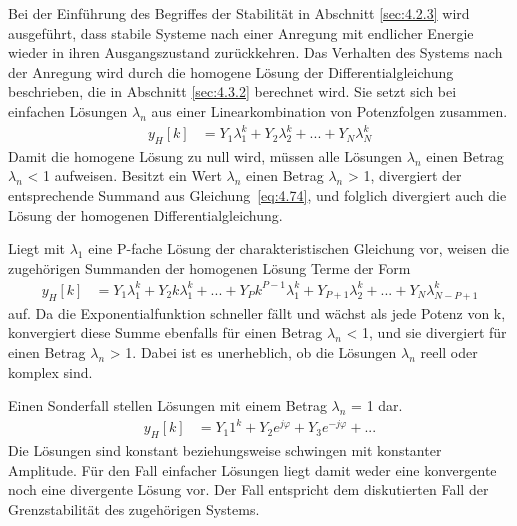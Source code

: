 Bei der Einführung des Begriffes der Stabilität in Abschnitt \ref{sec:4.2.3} wird ausgeführt, dass stabile Systeme nach einer Anregung mit endlicher Energie wieder in ihren Ausgangszustand zurückkehren. Das Verhalten des Systems nach der Anregung wird durch die homogene Lösung der Differentialgleichung beschrieben, die in Abschnitt \ref{sec:4.3.2} berechnet wird. Sie setzt sich bei einfachen Lösungen \(λ_{n}\) aus einer Linearkombination von Potenzfolgen zusammen.
\begin{align}
y_{H}[ k] &= Y_{1}  \lambda_{1}^{k} + Y_{2}  \lambda_{2}^{k} + ... + Y_{N}  \lambda_{N}^{k} \label{eq:4.74}
\end{align}
Damit die homogene Lösung zu null wird, müssen alle Lösungen \(λ_{n}\) einen Betrag \textbar \(λ_{n}\)\textbar{} \textless{} 1 aufweisen. Besitzt ein Wert \(λ_{n}\) einen Betrag \textbar \(λ_{n}\)\textbar{} \textgreater{} 1, divergiert der entsprechende Summand aus Gleichung~\eqref{eq:4.74}, und folglich divergiert auch die Lösung der homogenen Differentialgleichung.

Liegt mit \(λ_{1}\) eine P-fache Lösung der charakteristischen Gleichung vor, weisen die zugehörigen Summanden der homogenen Lösung Terme der Form
\begin{align}
y_{H}[ k] &= Y_{1}  \lambda_{1}^{k} + Y_{2}  k  \lambda_{1}^{k} + ... + Y_{P}  k^{P - 1}  \lambda_{1}^{k} + Y_{P + 1}  \lambda_{2}^{k} + ... + Y_{N}  \lambda_{N - P + 1}^{k} \label{eq:4.75}
\end{align}
auf. Da die Exponentialfunktion schneller fällt und wächst als jede Potenz von k, konvergiert diese Summe ebenfalls für einen Betrag \textbar \(λ_{n}\)\textbar{} \textless{} 1, und sie divergiert für einen Betrag \textbar \(λ_{n}\)\textbar{} \textgreater{} 1. Dabei ist es unerheblich, ob die Lösungen \(λ_{n}\) reell oder komplex sind.

Einen Sonderfall stellen Lösungen mit einem Betrag \textbar \(λ_{n}\)\textbar{} = 1 dar.
\begin{align}
y_{H}[ k] &= Y_{1}  1^{k} + Y_{2}  e^{j  \varphi} + Y_{3}  e^{- j  \varphi} + ... \label{eq:4.76}
\end{align}
Die Lösungen sind konstant beziehungsweise schwingen mit konstanter Amplitude. Für den Fall einfacher Lösungen liegt damit weder eine konvergente noch eine divergente Lösung vor. Der Fall entspricht dem diskutierten Fall der Grenzstabilität des zugehörigen Systems.


